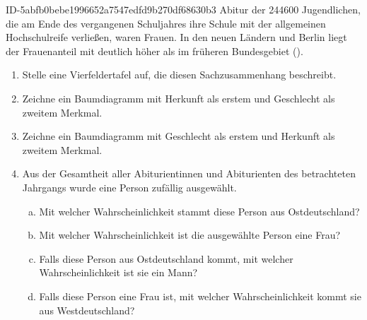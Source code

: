 \begin{exercise}
      {ID-5abfb0bebe1996652a7547edfd9b270df68630b3}
      {Abitur}
  \ifproblem\problem
     der \num{244600} Jugendlichen, die am Ende des vergangenen
    Schuljahres ihre Schule mit der allgemeinen Hochschulreife verließen,
    waren Frauen. In den neuen Ländern und Berlin liegt der Frauenanteil
    mit  deutlich höher als im früheren Bundesgebiet ().
    \begin{enumerate}
      \item Stelle eine Vierfeldertafel auf, die diesen Sachzusammenhang
            beschreibt.
      \item Zeichne ein Baumdiagramm mit \glqq Herkunft\grqq{} als erstem
            und \glqq{} Geschlecht\grqq{} als zweitem Merkmal.
      \item Zeichne ein Baumdiagramm mit \glqq Geschlecht\grqq{} als erstem
            und \glqq{} Herkunft\grqq{} als zweitem Merkmal.
      \item Aus der Gesamtheit aller Abiturientinnen und Abiturienten des
            betrachteten Jahrgangs wurde eine Person zufällig ausgewählt.
            \begin{enumerate}[a)]
              \item Mit welcher Wahrscheinlichkeit stammt diese Person aus
                    Ostdeutschland?
              \item Mit welcher Wahrscheinlichkeit ist die ausgewählte
                    Person eine Frau?
              \item Falls diese Person aus Ostdeutschland kommt, mit welcher
                    Wahrscheinlichkeit ist sie ein Mann?
              \item Falls diese Person eine Frau ist, mit welcher
                    Wahrscheinlichkeit kommt sie aus Westdeutschland?
            \end{enumerate}
    \end{enumerate}
  \fi
\end{exercise}
